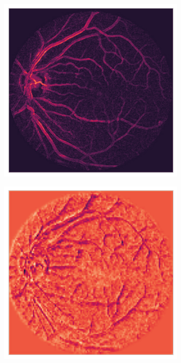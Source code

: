 \begin{figure}
    \begin{subfigure}[b]{0.19\textwidth}
         \centering
         \includegraphics[width=\textwidth, height=\textwidth]{figures/chapter6/features/9521_left/9521_left_0.png}
    \end{subfigure}
    \hfill
    \begin{subfigure}[b]{0.19\textwidth}
         \centering
         \includegraphics[width=\textwidth, height=\textwidth]{figures/chapter6/features/9521_left/9521_left_1.png}

\end{subfigure}
\end{figure}
